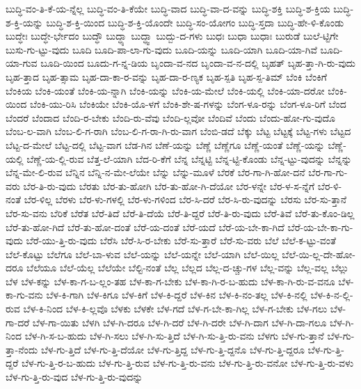 {ಬುದ್ಧಿ-ವಂ-ತಿ-ಕೆ-ಯ-ನ್ನೆಲ್ಲ
ಬುದ್ಧಿ-ವಂ-ತಿ-ಕೆಯೇ
ಬುದ್ಧಿ-ವಾದ
ಬುದ್ಧಿ-ವಾ-ದ-ವನ್ನು
ಬುದ್ಧಿ-ಶಕ್ತಿ
ಬುದ್ಧಿ-ಶ-ಕ್ತಿಯ
ಬುದ್ಧಿ-ಶ-ಕ್ತಿ-ಯನ್ನು
ಬುದ್ಧಿ-ಶ-ಕ್ತಿ-ಯಿಂದ
ಬುದ್ಧಿ-ಶ-ಕ್ತಿ-ಯೊಂದೇ
ಬುದ್ಧಿ-ಸಂ-ಯೋಗಂ
ಬುದ್ಧಿ-ಸ್ತದಾ
ಬುದ್ಧಿ-ಹೇ-ಳಿ-ಕೊಂಡು
ಬುದ್ಧೇಃ
ಬುದ್ಧೇ-ರ್ಭೇದಂ
ಬುದ್ಧೌ
ಬುದ್ಧ್ಯಾ
ಬುದ್ಧ್ವಾ
ಬುದ್ಬು-ದ-ಗಳು
ಬುಧಃ
ಬುಧಾ
ಬುಧಾಃ
ಬುರುಡೆ
ಬುಲೆ-ಟ್ಟಿಗೇ
ಬುಸು-ಗು-ಟ್ಟು-ವುದು
ಬೂದಿ
ಬೂದಿ-ಪಾ-ಲಾ-ಗು-ವುದು
ಬೂದಿ-ಯನ್ನು
ಬೂದಿ-ಯಾಗಿ
ಬೂದಿ-ಯಾ-ಗಿವೆ
ಬೂದಿ-ಯಾ-ಗುವ
ಬೂದಿ-ಯಿಂದ
ಬೂದು-ಗ-ನ್ನ-ಡಿಯ
ಬೃಂದಾ-ವ-ನದ
ಬೃಂದಾ-ವ-ನ-ದಲ್ಲಿ
ಬೃಹತ್
ಬೃಹ-ತ್ತಾ-ಗಿ-ರು-ವುದು
ಬೃಹ-ತ್ತಾದ
ಬೃಹ-ತ್ಸಾಮ
ಬೃಹ-ದಾ-ಕಾ-ರ-ವನ್ನು
ಬೃಹ-ದಾ-ರ-ಣ್ಯಕ
ಬೃಹ-ಸ್ಪತಿ
ಬೃಹ-ಸ್ಪ-ತಿಮ್
ಬೆಂಕಿ
ಬೆಂಕಿಗೆ
ಬೆಂಕಿಯ
ಬೆಂಕಿ-ಯಂತೆ
ಬೆಂಕಿ-ಯ-ನ್ನಾಗಿ
ಬೆಂಕಿ-ಯನ್ನು
ಬೆಂಕಿ-ಯ-ಮೇಲೆ
ಬೆಂಕಿ-ಯಲ್ಲಿ
ಬೆಂಕಿ-ಯಾ-ದರೋ
ಬೆಂಕಿ-ಯಿಂದ
ಬೆಂಕಿ-ಯು-ರಿಸಿ
ಬೆಂಕಿಯೇ
ಬೆಂಕಿ-ಯೊ-ಳಗೆ
ಬೆಂಕಿ-ಶೇ-ಷ-ಗಳನ್ನು
ಬೆಂಗ-ಳೂ-ರನ್ನು
ಬೆಂಗ-ಳೂ-ರಿಗೆ
ಬೆಂದ
ಬೆಂದರೆ
ಬೆಂದಾದ
ಬೆಂದಿ-ರ-ಬೇಕು
ಬೆಂದಿ-ರು-ವೆವು
ಬೆಂದಿ-ಲ್ಲವೋ
ಬೆಂದಿವೆ
ಬೆಂದು
ಬೆಂದು-ಹೋ-ಗು-ವುದೊ
ಬೆಂಬ-ಲ-ವಾಗಿ
ಬೆಂಬ-ಲಿ-ಗ-ರಾಗಿ
ಬೆಂಬ-ಲಿ-ಗ-ರಾ-ಗಿ-ರು-ವಾಗ
ಬೆಂಬಿ-ಡದೆ
ಬೆಕ್ಕು
ಬೆಟ್ಟ
ಬೆಟ್ಟಕ್ಕೆ
ಬೆಟ್ಟ-ಗಳು
ಬೆಟ್ಟದ
ಬೆಟ್ಟ-ದ-ಮೇಲೆ
ಬೆಟ್ಟ-ದಲ್ಲಿ
ಬೆಟ್ಟ-ವಾಗ
ಬೆಡ-ಗಿನ
ಬೆಣೆ-ಯನ್ನು
ಬೆಣ್ಣೆ
ಬೆಣ್ಣೆಗೂ
ಬೆಣ್ಣೆ-ಯಂತೆ
ಬೆಣ್ಣೆ-ಯನ್ನು
ಬೆಣ್ಣೆ-ಯಲ್ಲಿ
ಬೆಣ್ಣೆ-ಯ-ಲ್ಲಿ-ರುವ
ಬೆತ್ತ-ಲೆ-ಯಾಗಿ
ಬೆದ-ರಿ-ಕೆಗೆ
ಬೆನ್ನ
ಬೆನ್ನಟ್ಟಿ
ಬೆನ್ನ-ಟ್ಟಿ-ಕೊಂಡು
ಬೆನ್ನ-ಟ್ಟು-ವುದನ್ನು
ಬೆನ್ನನ್ನು
ಬೆನ್ನ-ಮೇ-ಲಿ-ರುವ
ಬೆನ್ನಿನ
ಬೆನ್ನಿ-ನ-ಮೇ-ಲೆಯೇ
ಬೆನ್ನು
ಬೆನ್ನು-ಮೂಳೆ
ಬೆರಕೆ
ಬೆರ-ಗಾ-ಗಿ-ಹೋ-ದನೆ
ಬೆರ-ಗಾ-ಗು-ವರು
ಬೆರ-ತಿ-ರು-ವುದು
ಬೆರತು
ಬೆರ-ತು-ಹೋಗಿ
ಬೆರ-ತು-ಹೋ-ಗಿ-ದೆಯೋ
ಬೆರ-ಳನ್ನೇ
ಬೆರ-ಳ-ಸ-ನ್ನೆಗೆ
ಬೆರ-ಳಿ-ನಂತೆ
ಬೆರ-ಳಿಲ್ಲ
ಬೆರಳು
ಬೆರ-ಳು-ಗಳಲ್ಲಿ
ಬೆರ-ಳು-ಗಳಿಂದ
ಬೆರ-ಸಿ-ದರೆ
ಬೆರ-ಸಿ-ರು-ವುದನ್ನು
ಬೆರಸು
ಬೆರ-ಸು-ತ್ತಾನೆ
ಬೆರ-ಸು-ವನು
ಬೆರಿಕೆ
ಬೆರೆತ
ಬೆರೆ-ತಿದೆ
ಬೆರೆ-ತಿ-ದೆಯೆ
ಬೆರೆ-ತಿ-ದ್ದರೆ
ಬೆರೆ-ತಿ-ರು-ವುದು
ಬೆರೆ-ತಿವೆ
ಬೆರೆ-ತು-ಕೊಂ-ಡಿಲ್ಲ
ಬೆರೆ-ತು-ಹೋ-ಗಿದೆ
ಬೆರೆ-ತು-ಹೋ-ದಂತೆ
ಬೆರೆ-ಯ-ದಂತೆ
ಬೆರೆ-ಯದೆ
ಬೆರೆ-ಯ-ಬೇ-ಕಾ-ಗಿದೆ
ಬೆರೆ-ಯ-ಬೇ-ಕಾ-ಗು-ವುದು
ಬೆರೆ-ಯು-ತ್ತಿ-ರು-ವುದು
ಬೆರೆಸಿ
ಬೆರೆ-ಸಿ-ರ-ಬೇಕು
ಬೆರೆ-ಸು-ತ್ತಾರೆ
ಬೆರೆ-ಸು-ವರು
ಬೆಲೆ
ಬೆಲೆ-ಕ-ಟ್ಟು-ವಂತೆ
ಬೆಲೆ-ಕೊಟ್ಟು
ಬೆಲೆಗೂ
ಬೆಲೆ-ಬಾ-ಳುವ
ಬೆಲೆ-ಯನ್ನು
ಬೆಲೆ-ಯನ್ನೇ
ಬೆಲೆ-ಯಾಗಿ
ಬೆಲೆ-ಯಿಲ್ಲ
ಬೆಲೆ-ಯಿ-ಲ್ಲ-ದೇ-ಹೋ-ದರೂ
ಬೆಲೆಯೂ
ಬೆಲೆ-ಯೆಲ್ಲ
ಬೆಲೆಯೇ
ಬೆಲ್ಟಿ-ನಂತೆ
ಬೆಲ್ಲ
ಬೆಲ್ಲದ
ಬೆಲ್ಲ-ದ-ಚ್ಚು-ಗಳ
ಬೆಲ್ಲ-ವನ್ನು
ಬೆಲ್ಲ-ವಲ್ಲ
ಬೆಲ್ಲು
ಬೆಳ
ಬೆಳ-ಕನ್ನು
ಬೆಳ-ಕಾ-ಗ-ಬ-ಲ್ಲಂ-ತಹ
ಬೆಳ-ಕಾ-ಗ-ಬೇಕು
ಬೆಳ-ಕಾ-ಗಿ-ರ-ಬ-ಹುದು
ಬೆಳ-ಕಾ-ಗಿ-ರು-ವ-ವನೂ
ಬೆಳ-ಕಾ-ಗು-ವನು
ಬೆಳ-ಕಿ-ಗಾಗಿ
ಬೆಳ-ಕಿಗೂ
ಬೆಳ-ಕಿಗೆ
ಬೆಳ-ಕಿ-ದ್ದರೆ
ಬೆಳ-ಕಿನ
ಬೆಳ-ಕಿ-ನಂ-ತಲ್ಲ
ಬೆಳ-ಕಿ-ನಲ್ಲಿ
ಬೆಳ-ಕಿ-ನ-ಲ್ಲಿ-ರುವ
ಬೆಳ-ಕಿ-ನಿಂದ
ಬೆಳ-ಕಿ-ಲ್ಲವೊ
ಬೆಳಕು
ಬೆಳಕೇ
ಬೆಳ-ಗದೆ
ಬೆಳ-ಗ-ಬೇ-ಕಾ-ಗಿಲ್ಲ
ಬೆಳ-ಗ-ಬೇಕು
ಬೆಳ-ಗಲು
ಬೆಳ-ಗಾ-ದರೆ
ಬೆಳ-ಗಾ-ಯಿತು
ಬೆಳಗಿ
ಬೆಳ-ಗಿ-ದರೂ
ಬೆಳ-ಗಿ-ದರೆ
ಬೆಳ-ಗಿ-ದರೇ
ಬೆಳ-ಗಿ-ದಾಗ
ಬೆಳ-ಗಿ-ದಾ-ಗಲೂ
ಬೆಳ-ಗಿ-ನಿಂದ
ಬೆಳ-ಗಿ-ಸ-ಬ-ಹುದು
ಬೆಳ-ಗಿ-ಸಲು
ಬೆಳ-ಗಿ-ಸು-ತ್ತಿದೆ
ಬೆಳ-ಗಿ-ಸು-ತ್ತಿ-ರು-ವನು
ಬೆಳಗು
ಬೆಳ-ಗು-ತ್ತಾನೆ
ಬೆಳ-ಗು-ತ್ತಾ-ನೆಂದು
ಬೆಳ-ಗು-ತ್ತಿದೆ
ಬೆಳ-ಗು-ತ್ತಿ-ದೆಯೋ
ಬೆಳ-ಗು-ತ್ತಿದ್ದ
ಬೆಳ-ಗು-ತ್ತಿ-ದ್ದನೊ
ಬೆಳ-ಗು-ತ್ತಿ-ದ್ದರೂ
ಬೆಳ-ಗು-ತ್ತಿ-ದ್ದರೆ
ಬೆಳ-ಗು-ತ್ತಿ-ರ-ಬ-ಹುದು
ಬೆಳ-ಗು-ತ್ತಿ-ರುವ
ಬೆಳ-ಗು-ತ್ತಿ-ರು-ವನು
ಬೆಳ-ಗು-ತ್ತಿ-ರು-ವನೋ
ಬೆಳ-ಗು-ತ್ತಿ-ರು-ವಳು
ಬೆಳ-ಗು-ತ್ತಿ-ರು-ವುದ
ಬೆಳ-ಗು-ತ್ತಿ-ರು-ವುದನ್ನು
}
